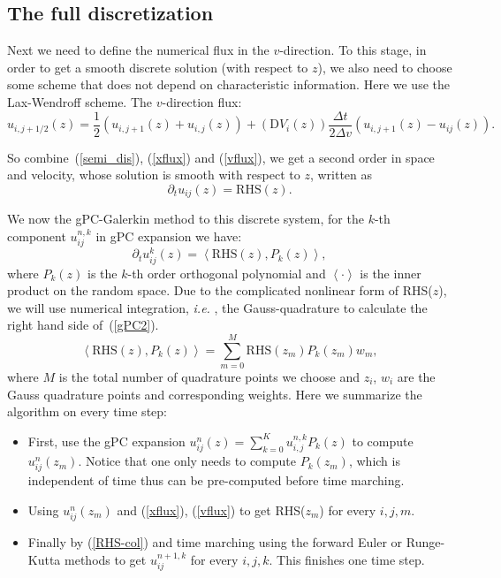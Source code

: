 \documentclass[12pt]{article}
\theoremstyle{plain}
\theoremstyle{remark}
\theoremstyle{remark}
\theoremstyle{remark}
\numberwithin{equation}{section}
\newcommand{\ie}{{\it i.e. \/}}
\newcommand{\dt}{\partial_t}
\begin{document}
\subsection{The full discretization}

Next we need to define the numerical flux in the $v$-direction. To this stage, in order to get a smooth discrete solution (with respect to $z$), we also need to choose some scheme that does not depend on characteristic information.
Here we  use the Lax-Wendroff scheme. The $v$-direction flux:
\begin{equation} \label{vflux}
u_{i,j+1/2}(z) = \frac{1}{2}(u_{i,j+1}(z)+u_{i,j}(z))
  + (\mathrm{D}V_i(z))\frac{\Delta t}{2\Delta v}(u_{i,j+1}(z)-u_{ij}(z)).
\end{equation}

So combine~(\ref{semi_dis}), (\ref{xflux}) and (\ref{vflux}), we get a second order in space and velocity,  whose solution is smooth with respect to $z$,
 written as
\begin{equation}
  \dt u_{ij}(z) = \mathrm{RHS}(z).
\end{equation}

We now the gPC-Galerkin method to this discrete system, for the $k$-th component $u^{n,k}_{ij}$ in gPC expansion we have:
\begin{equation} \label{gPC2}
  \dt u^{k}_{ij}(z) = \left<\mathrm{RHS}(z),P_k(z)\right>,
\end{equation}
where $P_k(z)$ is the $k$-th order orthogonal polynomial and $\left<\cdot\right>$ is the inner product on the random space.
Due to the complicated nonlinear form of RHS($z$), we will use numerical integration, \ie, the Gauss-quadrature to calculate the right hand side of~(\ref{gPC2}).
\begin{equation}\label{RHS-col}
  \left<\mathrm{RHS}(z),P_k(z)\right> = \sum_{m=0}^{M}\mathrm{RHS}(z_m)P_k(z_m)w_m,
\end{equation}
where $M$ is the total number of quadrature points we choose and $z_i$, $w_i$ are the Gauss quadrature points and corresponding weights. 
Here we summarize the algorithm on every time step:
\begin{itemize}
  \item First, use the gPC expansion $u^n_{ij}(z) = \sum\limits_{k=0}^K u^{n,k}_{i,j}P_k(z)$ to compute $u^n_{ij}(z_m)$. Notice that one only needs to compute $P_k(z_m)$, which is independent of time thus can be pre-computed before time marching. 
  \item Using $u^n_{ij}(z_m)$ and (\ref{xflux}), (\ref{vflux}) to get RHS($z_m$) for every $i,j,m$.
  \item Finally by (\ref{RHS-col}) and time marching using the forward Euler or Runge-Kutta methods to get $u^{n+1,k}_{ij}$ for every $i,j,k$. This finishes one time step. 
\end{itemize}
 
\end{document}
